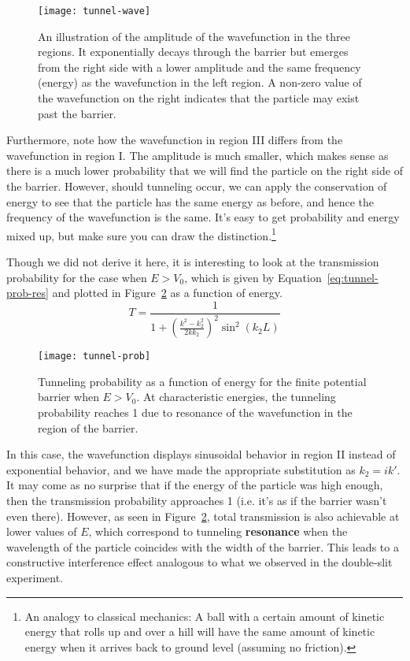 \begin{figure}[!h]
	\centering
	\texttt{[image: tunnel-wave]}
	\caption{An illustration of the amplitude of the wavefunction in the three regions. It exponentially decays through the barrier but emerges from the right side with a lower amplitude and the same frequency (energy) as the wavefunction in the left region. A non-zero value of the wavefunction on the right indicates that the particle may exist past the barrier.}
	\label{fig:tunnel-wave}
\end{figure}

Furthermore, note how the wavefunction in region III differs from the wavefunction in region I. The amplitude is much smaller, which makes sense as there is a much lower probability that we will find the particle on the right side of the barrier. However, should tunneling occur, we can apply the conservation of energy to see that the particle has the same energy as before, and hence the frequency of the wavefunction is the same. It's easy to get probability and energy mixed up, but make sure you can draw the distinction.\footnote{An analogy to classical mechanics: A ball with a certain amount of kinetic energy that rolls up and over a hill will have the same amount of kinetic energy when it arrives back to ground level (assuming no friction).} \par 

Though we did not derive it here, it is interesting to look at the transmission probability for the case when $E > V_0$, which is given by Equation~\ref{eq:tunnel-prob-res} and plotted in Figure~\ref{fig:tunnel-prob} as a function of energy.
\begin{equation}
	\boxed{T = \frac{1}{1 + \left(\frac{k^2-k_2^2}{2kk_2}\right)^2 \sin^2(k_2L)}} \label{eq:tunnel-prob-res}
\end{equation}

\begin{figure}[!h]
	\centering
	\texttt{[image: tunnel-prob]}
	\caption{Tunneling probability as a function of energy for the finite potential barrier when $E > V_0$. At characteristic energies, the tunneling probability reaches 1 due to resonance of the wavefunction in the region of the barrier.}
	\label{fig:tunnel-prob}
\end{figure}

In this case, the wavefunction displays sinusoidal behavior in region II instead of exponential behavior, and we have made the appropriate substitution as $k_2=ik'$. It may come as no surprise that if the energy of the particle was high enough, then the transmission probability approaches 1 (i.e. it's as if the barrier wasn't even there). However, as seen in Figure~\ref{fig:tunnel-prob}, total transmission is also achievable at lower values of $E$, which correspond to tunneling \textbf{resonance} when the wavelength of the particle coincides with the width of the barrier. This leads to a constructive interference effect analogous to what we observed in the double-slit experiment.

